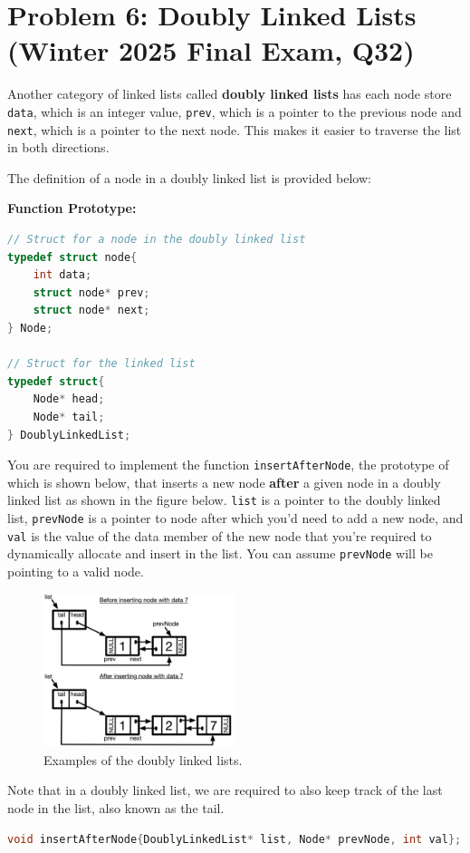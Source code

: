 \documentclass[12pt]{article}
\begin{document}
{\section*{Problem 6: Doubly Linked Lists (Winter 2025 Final Exam, Q32)}
Another category of linked lists called \textbf{doubly linked lists} has each node store \texttt{data}, which is an integer value, \texttt{prev}, which is a pointer to the previous node and \texttt{next}, which is a pointer to the next node. This makes it easier to traverse the list in both directions.

The definition of a node in a doubly linked list is provided below:

\textbf{Function Prototype:}
\begin{lstlisting}[language=C]
// Struct for a node in the doubly linked list
typedef struct node{
	int data;
	struct node* prev;
	struct node* next;
} Node;

// Struct for the linked list
typedef struct{
	Node* head;
	Node* tail;
} DoublyLinkedList;
\end{lstlisting}

You are required to implement the function \texttt{insertAfterNode}, the prototype of which is shown below, that inserts a new node \textbf{after} a given node in a doubly linked list as shown in the figure below. \texttt{list} is a pointer to the doubly linked list, \texttt{prevNode} is a pointer to node after which you'd need to add a new node, and \texttt{val} is the value of the data member of the new node that you're required to dynamically allocate and insert in the list. You can assume \texttt{prevNode} will be pointing to a valid node.

\begin{figure}[h]
	\centering
	\includegraphics[width=0.5\textwidth]{./doubly.png}  %
	\caption{Examples of the doubly linked lists.}
\end{figure}
Note that in a doubly linked list, we are required to also keep track of the last node in the list, also known as the tail.
\begin{lstlisting}[language=C]
	void insertAfterNode{DoublyLinkedList* list, Node* prevNode, int val};
\end{lstlisting}

}
\end{document}
